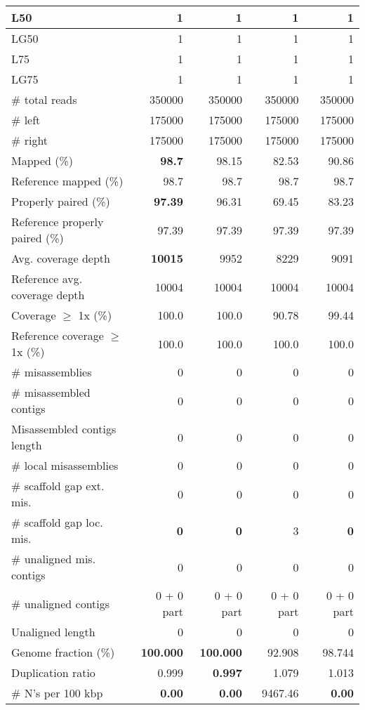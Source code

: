 \documentclass[12pt,a4paper]{article}
\begin{document}
\begin{table}[ht]
\begin{center}
\begin{tabular}{|l*{4}{|r}|}
L50 & 1 & 1 & 1 & 1 \\ \hline
LG50 & 1 & 1 & 1 & 1 \\ \hline
L75 & 1 & 1 & 1 & 1 \\ \hline
LG75 & 1 & 1 & 1 & 1 \\ \hline
\# total reads & 350000 & 350000 & 350000 & 350000 \\ \hline
\# left & 175000 & 175000 & 175000 & 175000 \\ \hline
\# right & 175000 & 175000 & 175000 & 175000 \\ \hline
Mapped (\%) & {\bf 98.7} & 98.15 & 82.53 & 90.86 \\ \hline
Reference mapped (\%) & 98.7 & 98.7 & 98.7 & 98.7 \\ \hline
Properly paired (\%) & {\bf 97.39} & 96.31 & 69.45 & 83.23 \\ \hline
Reference properly paired (\%) & 97.39 & 97.39 & 97.39 & 97.39 \\ \hline
Avg. coverage depth & {\bf 10015} & 9952 & 8229 & 9091 \\ \hline
Reference avg. coverage depth & 10004 & 10004 & 10004 & 10004 \\ \hline
Coverage $\geq$ 1x (\%) & 100.0 & 100.0 & 90.78 & 99.44 \\ \hline
Reference coverage $\geq$ 1x (\%) & 100.0 & 100.0 & 100.0 & 100.0 \\ \hline
\# misassemblies & 0 & 0 & 0 & 0 \\ \hline
\# misassembled contigs & 0 & 0 & 0 & 0 \\ \hline
Misassembled contigs length & 0 & 0 & 0 & 0 \\ \hline
\# local misassemblies & 0 & 0 & 0 & 0 \\ \hline
\# scaffold gap ext. mis. & 0 & 0 & 0 & 0 \\ \hline
\# scaffold gap loc. mis. & {\bf 0} & {\bf 0} & 3 & {\bf 0} \\ \hline
\# unaligned mis. contigs & 0 & 0 & 0 & 0 \\ \hline
\# unaligned contigs & 0 + 0 part & 0 + 0 part & 0 + 0 part & 0 + 0 part \\ \hline
Unaligned length & 0 & 0 & 0 & 0 \\ \hline
Genome fraction (\%) & {\bf 100.000} & {\bf 100.000} & 92.908 & 98.744 \\ \hline
Duplication ratio & 0.999 & {\bf 0.997} & 1.079 & 1.013 \\ \hline
\# N's per 100 kbp & {\bf 0.00} & {\bf 0.00} & 9467.46 & {\bf 0.00} \\ \hline

\end{tabular}
\end{center}
\end{table}
\end{document}
